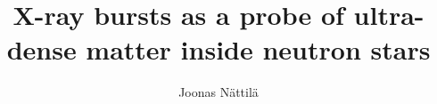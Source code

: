 \begin{titlepage} 

    \title{\titlefont X-ray bursts as a probe of ultra-dense matter inside neutron stars}
    
    \author{Joonas Nättilä}
    \date{}
    \maketitle


\end{titlepage}

